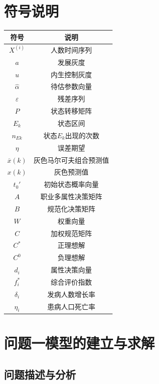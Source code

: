 \documentclass{whutmod}
\begin{document}
	\section{符号说明}
	\begin{table}[H]
	\label{biao} \centering
	\begin{tabular}{cc}
		\toprule[1.5pt]
		\multicolumn{1}{m{5cm}}{\centering 符号} & \multicolumn{1}{m{5cm}}{\centering 说明} \\
		\midrule[0.5pt]		
		$X^{(i)}$  & 人数时间序列  \\ 
		$a$  &  发展灰度 \\ 
		$u$  &  内生控制灰度\\
		$\widehat{\alpha}$  &  待估参数向量 \\ 
		$\varepsilon$ & 残差序列\\
		$P$	 &  状态转移矩阵  \\ 
		$E_{k}$ &  状态区间 \\ 
		$n_{Ek}$	 &  状态$E_{k}$出现的次数 \\ 
		$\eta $  &   误差期望\\ 
		$\overline{x}(k)$  &  灰色马尔可夫组合预测值\\	
		$\widehat{x}(k)$ & 灰色预测值\\
		$t_{0}'$ &  初始状态概率向量\\ 
		$A$ & 职业多属性决策矩阵\\
		$B$ & 规范化决策矩阵\\
		$W$ & 权重向量\\
		$C$  & 加权规范矩阵\\
		$C^{*}$ & 正理想解\\
		$C^{0}$ & 负理想解\\
		$d_{i}$ & 属性决策向量\\
		$ f_{i}^{*}$ &  综合评价指数\\
		$ \delta_{i}$ &发病人数增长率 \\
		$ \eta_{i}$    &患病人口死亡率 \\
		\bottomrule[1.5pt]
	\end{tabular}
\end{table}

	\section{问题一模型的建立与求解}
    \subsection{问题描述与分析}
\end{document}
